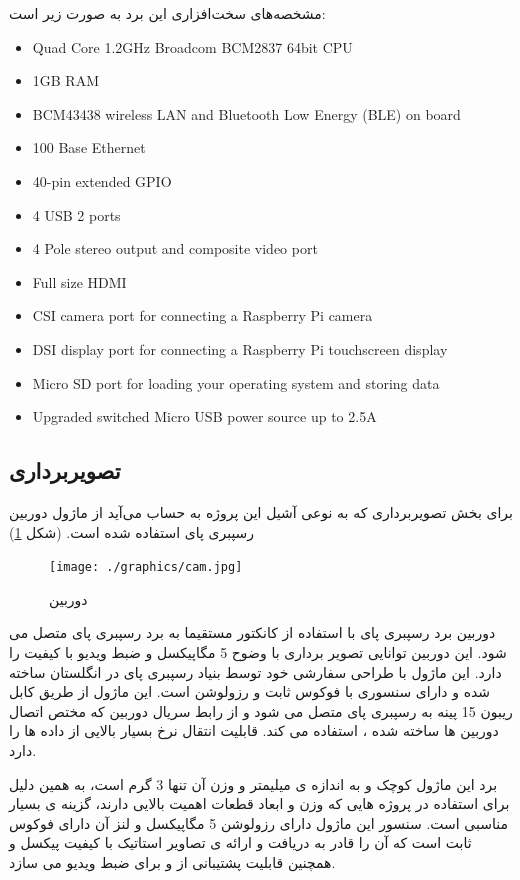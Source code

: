 \documentclass{article}
\begin{document}
مشخصه‌های سخت‌افزاری این برد به صورت زیر است:
\begin{latin}
\begin{itemize}
	\item Quad Core 1.2GHz Broadcom BCM2837 64bit CPU
	\item 1GB RAM
	\item BCM43438 wireless LAN and Bluetooth Low Energy (BLE) on board
	\item 100 Base Ethernet
	\item 40-pin extended GPIO
	\item 4 USB 2 ports
	\item 4 Pole stereo output and composite video port
	\item Full size HDMI
	\item CSI camera port for connecting a Raspberry Pi camera
	\item DSI display port for connecting a Raspberry Pi touchscreen display
	\item Micro SD port for loading your operating system and storing data
	\item Upgraded switched Micro USB power source up to 2.5A
\end{itemize}
\end{latin}

\subsection{تصویر‌برداری}
برای بخش تصویر‌برداری که به نوعی آشیل این پروژه به حساب می‌آید از ماژول دوربین رسپبری پای 
استفاده شده است. (شکل \ref{cam}) 

\begin{figure}
	\centering
	\texttt{[image: ./graphics/cam.jpg]}
	\caption{دوربین }
	\label{cam}
\end{figure}

دوربین برد رسپبری پای با استفاده از کانکتور  مستقیما به برد رسپبری پای متصل می شود. این دوربین توانایی تصویر برداری با وضوح 5 مگاپیکسل و ضبط ویدیو با کیفیت  را دارد. این ماژول با طراحی سفارشی خود توسط بنیاد رسپبری پای در انگلستان ساخته شده و دارای سنسوری با فوکوس ثابت و رزولوشن  است. این ماژول از طریق کابل ریبون 15 پینه به رسپبری پای متصل می شود و از رابط سریال دوربین که مختص اتصال دوربین ها ساخته شده ،  استفاده می کند.  قابلیت انتقال نرخ بسیار بالایی از داده ها را دارد.

برد این ماژول کوچک و به اندازه ی  میلیمتر  و وزن آن تنها 3 گرم است، به همین دلیل برای استفاده در پروژه هایی که وزن و ابعاد قطعات اهمیت بالایی دارند، گزینه ی بسیار مناسبی است. سنسور این ماژول دارای رزولوشن 5 مگاپیکسل و لنز آن دارای فوکوس ثابت است که آن را قادر به دریافت و ارائه ی تصاویر استاتیک با کیفیت  پیکسل و همچنین قابلیت پشتیبانی از   و   برای ضبط ویدیو می سازد.
\end{document}
